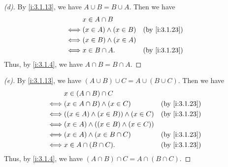\begin{proof}[(d)]
  By \cref{i:3.1.13}, we have \(A \cup B = B \cup A\).
  Then we have
  \begin{align*}
         & x \in A \cap B                               \\
    \iff & (x \in A) \land (x \in B) &  & \by{i:3.1.23} \\
    \iff & (x \in B) \land (x \in A)                    \\
    \iff & x \in B \cap A.           &  & \by{i:3.1.23}
  \end{align*}
  Thus, by \cref{i:3.1.4}, we have \(A \cap B = B \cap A\).
\end{proof}

\begin{proof}[(e)]
  By \cref{i:3.1.13}, we have \((A \cup B) \cup C = A \cup (B \cup C)\).
  Then we have
  \begin{align*}
         & x \in (A \cap B) \cap C                                        \\
    \iff & (x \in A \cap B) \land (x \in C)            &  & \by{i:3.1.23} \\
    \iff & ((x \in A) \land (x \in B)) \land (x \in C) &  & \by{i:3.1.23} \\
    \iff & (x \in A) \land ((x \in B) \land (x \in C))                    \\
    \iff & (x \in A) \land (x \in B \cap C)            &  & \by{i:3.1.23} \\
    \iff & x \in A \cap (B \cap C).                    &  & \by{i:3.1.23}
  \end{align*}
  Thus, by \cref{i:3.1.4}, we have \((A \cap B) \cap C = A \cap (B \cap C)\).
\end{proof}

